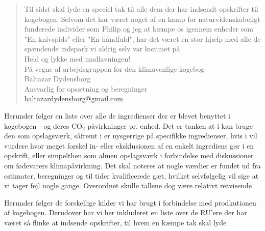 \documentclass[11pt, a4paper]{article}
\newcommand{\coo}{CO$_2$ }
\begin{document}
\begin{abstract}
\noindent Til sidst skal lyde en speciel tak til alle dem der har indsendt opskrifter til kogebogen. Selvom det har været noget af en kamp for naturvidenskabeligt funderede individer som Philip og jeg at kæmpe os igennem enheder som "En knivspids" eller "En håndfuld", har det været en stor hjælp med alle de spændende indspark vi aldrig selv var kommet på\\
	
\noindent	Held og lykke med madlavningen!\\
 På vegne af arbejdsgruppen for den klimavenlige kogebog\\
	Baltazar Dydensborg\\
	Ansvarlig for opsætning og beregninger\\
	\href{mailto:baltazardydensborg@gmail.com}{baltazardydensborg@gmail.com}
\end{abstract}
\newpage
\tableofcontents

\vspace{5em}
\newpage


	
\newpage


Herunder følger en liste over alle de ingredienser der er blevet benyttet i kogebogen - og deres \coo påvirkninger pr. enhed. Det er tanken at i kan bruge den som opslagsværk, såfremt i er nysgerrige på specifikke ingredienser, hvis i vil vurdere hvor meget forskel in- eller eksklusionen af en enkelt ingrediens gør i en opskrift, eller simpelthen som almen opslagsværk i forbindelse med diskussioner om fødevarers klimapåvirkning. Det skal noteres at nogle værdier er fundet ud fra estimater, beregninger og til tider kvalificerede gæt, hvilket selvfølgelig vil sige at vi tager fejl nogle gange. Overordnet skulle tallene dog være relativt retvisende\\

\begin{itemize}
	\rucooingredients
\end{itemize}


Herunder følger de forskellige kilder vi har brugt i forbindelse med prodkutionen af kogebogen. Derudover har vi her inkluderet en liste over de RU'ere der har været så flinke at indsende opskrifter, til hvem en kæmpe tak skal lyde
\end{document}
